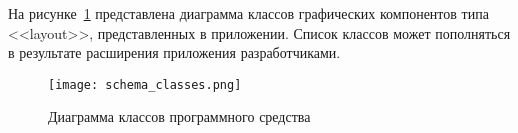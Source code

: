 На рисунке~\ref{sec:development:schema_classes} представлена диаграмма классов графических компонентов типа <<layout>>, представленных в приложении. Список классов может пополняться в результате расширения приложения разработчиками.\pagebreak

\begin{figure}[ht]
  \centering
    \texttt{[image: schema\_classes.png]}
    \caption{Диаграмма классов программного средства}
    \label{sec:development:schema_classes}
\end{figure}







